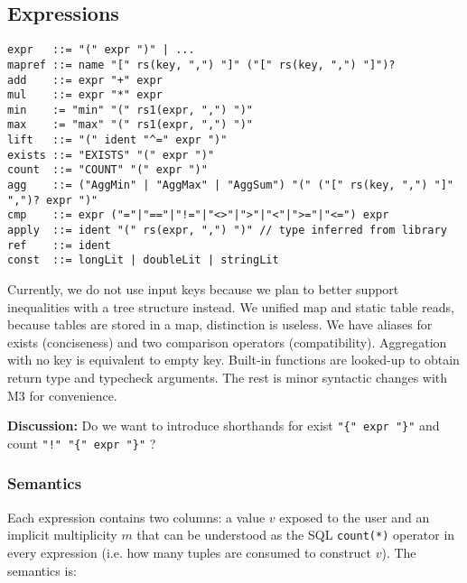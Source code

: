 \documentclass[10pt]{article}
\newlength{\dlen}
\def\discuss#1{\par\hspace{2em}
\setlength{\dlen}{\textwidth}
\addtolength{\dlen}{-2em}
\begin{minipage}{\dlen}\footnotesize {\bf\color{red} Discussion:} #1\end{minipage}\par}
\begin{document}
\subsection{Expressions}
\begin{verbatim}
expr   ::= "(" expr ")" | ...
mapref ::= name "[" rs(key, ",") "]" ("[" rs(key, ",") "]")?
add    ::= expr "+" expr
mul    ::= expr "*" expr
min    := "min" "(" rs1(expr, ",") ")"
max    := "max" "(" rs1(expr, ",") ")"
lift   ::= "(" ident "^=" expr ")"
exists ::= "EXISTS" "(" expr ")"
count  ::= "COUNT" "(" expr ")"
agg    ::= ("AggMin" | "AggMax" | "AggSum") "(" ("[" rs(key, ",") "]" ",")? expr ")"
cmp    ::= expr ("="|"=="|"!="|"<>"|">"|"<"|">="|"<=") expr
apply  ::= ident "(" rs(expr, ",") ")" // type inferred from library
ref    ::= ident
const  ::= longLit | doubleLit | stringLit
\end{verbatim}

Currently, we do not use input keys because we plan to better support inequalities with a tree structure instead. We unified map and static table reads, because tables are stored in a map, distinction is useless. We have aliases for exists (conciseness) and two comparison operators (compatibility). Aggregation with no key is equivalent to empty key. Built-in functions are looked-up to obtain return type and typecheck arguments. The rest is minor syntactic changes with M3 for convenience.
\discuss{Do we want to introduce shorthands for exist {\tt "\{" expr "\}"} and count {\tt "!" "\{" expr "\}"} ? }

\subsubsection*{Semantics}
Each expression contains two columns: a value $v$ exposed to the user and an implicit multiplicity $m$ that can be understood as the SQL {\tt count(*)} operator in every expression (i.e. how many tuples are consumed to construct $v$). The semantics is:
\end{document}
